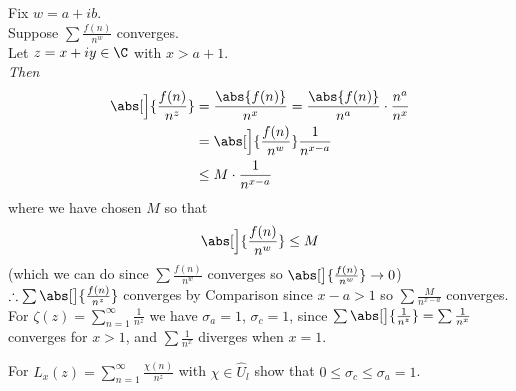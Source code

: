 Fix $w=a+ib$. \\
Suppose $\sum\frac{f(n)}{n^w}$ converges. \\
Let $z=x+iy\in\C$ with $x>a+1$. \\
\emph{Then}
\begin{align*}
\abs[\Big]{\frac{f(n)}{n^z}} &= \frac{\abs{f(n)}}{n^x} = \frac{\abs{f(n)}}{n^a}\cdot\frac{n^a}{n^x} \\
&= \abs[\Big]{\frac{f(n)}{n^w}}\frac{1}{n^{x-a}} \\
&\leq M\cdot\frac{1}{n^{x-a}}
\end{align*}
where we have chosen $M$ so that
\[ \abs[\Big]{\frac{f(n)}{n^w}} \leq M \]
(which we can do since $\sum\frac{f(n)}{n^w}$ converges so $\abs[\big]{\frac{f(n)}{n^w}}\to0$) \\
$\therefore\sum\abs[\big]{\frac{f(n)}{n^z}}$ converges by Comparison since $x-a>1$ so $\sum\frac{M}{n^{x-a}}$ converges. \\
\eg For $\zeta(z)=\sum_{n=1}^\infty\frac{1}{n^z}$ we have $\sigma_a=1$, $\sigma_c=1$, since $\sum\abs[\big]{\frac{1}{n^z}}=\sum\frac{1}{n^x}$ converges for $x>1$, and $\sum\frac1{n^x}$ diverges when $x=1$.

\eg For $L_x(z)=\sum_{n=1}^\infty\frac{\chi(n)}{n^z}$ with $\chi\in\hat U_l$ show that $0\leq\sigma_c\leq\sigma_a=1$.
